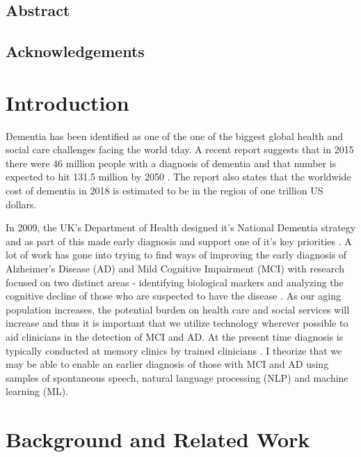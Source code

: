 \documentclass[twopages, a4paper]{book}
\begin{document}
\maketitle
\newpage
\section*{Abstract}
\newpage
\section*{Acknowledgements}
\newpage
\tableofcontents
\newpage
\listoffigures
\listoftables
\chapter{Introduction}
Dementia has been identified as one of the one of the biggest global health and social care challenges facing the world tday. A recent report suggests that in 2015 there were 46 million people with a diagnosis of dementia and that number is expected to hit 131.5 million by 2050 \cite{Prince2015}. The report also states that the worldwide cost of dementia in 2018 is estimated to be in the region of one trillion US dollars.
\par
In 2009, the UK's Department of Health designed it's National Dementia strategy and as part of this made early diagnosis and support one of it's key priorities \cite{England2009}. A lot of work has gone into trying to find ways of improving the early diagnosis of Alzheimer's Disease (AD) and Mild Cognitive Impairment (MCI) with research focused on two distinct areas - identifying biological markers and analyzing the cognitive decline of those who are suspected to have the disease \cite{Taler2008}. As our aging population increases, the potential burden on health care and social services will increase and thus it is important that we utilize technology wherever possible to aid clinicians in the detection of MCI and AD. At the present time diagnosis is typically conducted at memory clinics by trained clinicians \cite{Boschi2017}. I theorize that we may be able to enable an earlier diagnosis of those with MCI and AD using samples of spontaneous speech, natural language processing (NLP) and machine learning (ML).
\par
\chapter{Background and Related Work}
\end{document}
